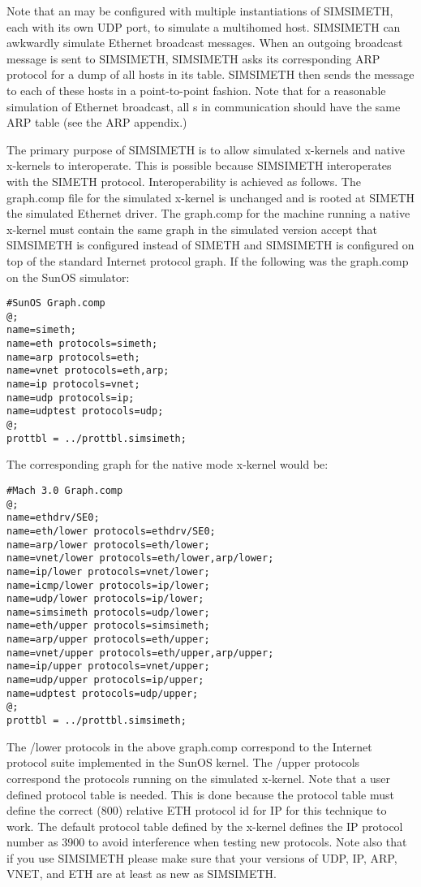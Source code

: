 Note that an \xk{} may be configured with multiple instantiations of
SIMSIMETH, each with its own UDP port, to simulate a multihomed host.
SIMSIMETH can awkwardly simulate Ethernet broadcast messages.  
When an
outgoing broadcast message is sent to SIMSIMETH, SIMSIMETH asks its
corresponding  ARP
protocol  for a dump of all hosts in its table.
SIMSIMETH then sends the message to each of these hosts in a
point-to-point fashion.  Note that for a reasonable simulation of
Ethernet broadcast, all
\xk{}s in communication should have the same ARP table (see the ARP
appendix.) 

The primary purpose of SIMSIMETH is to allow simulated x-kernels and 
native x-kernels to interoperate. This is possible because SIMSIMETH 
interoperates with the SIMETH protocol. Interoperability is achieved as 
follows. The graph.comp file for the simulated x-kernel is unchanged and 
is rooted at SIMETH the simulated Ethernet driver.  The graph.comp for the
machine running a native x-kernel must contain the same graph in the 
simulated version accept that SIMSIMETH is configured instead of SIMETH
and SIMSIMETH is configured on top of the standard Internet protocol 
graph.  If the following was the graph.comp on the SunOS simulator:

\begin{verbatim}
#SunOS Graph.comp
@;
name=simeth;
name=eth protocols=simeth;
name=arp protocols=eth; 
name=vnet protocols=eth,arp; 
name=ip protocols=vnet; 
name=udp protocols=ip;
name=udptest protocols=udp;
@;
prottbl = ../prottbl.simsimeth;
\end{verbatim}

The corresponding graph for the native mode x-kernel would be:

\begin{verbatim}
#Mach 3.0 Graph.comp
@;
name=ethdrv/SE0;
name=eth/lower protocols=ethdrv/SE0;
name=arp/lower protocols=eth/lower;
name=vnet/lower protocols=eth/lower,arp/lower;
name=ip/lower protocols=vnet/lower;
name=icmp/lower protocols=ip/lower;
name=udp/lower protocols=ip/lower;
name=simsimeth protocols=udp/lower;
name=eth/upper protocols=simsimeth;
name=arp/upper protocols=eth/upper;
name=vnet/upper protocols=eth/upper,arp/upper;
name=ip/upper protocols=vnet/upper;
name=udp/upper protocols=ip/upper;
name=udptest protocols=udp/upper;
@;
prottbl = ../prottbl.simsimeth;
\end{verbatim}

The /lower protocols in the above graph.comp correspond to the Internet 
protocol suite implemented in the SunOS kernel. The /upper protocols 
correspond the protocols running on the simulated x-kernel. Note that 
a user defined protocol table is needed. This is done because the 
protocol table must define the correct (800) relative ETH protocol id for 
IP for this  technique to work. The default protocol table defined by 
the x-kernel defines the IP protocol number as 3900 to avoid interference 
when testing new protocols. Note also that if you use SIMSIMETH 
please make sure that your versions of UDP, IP, ARP, VNET, and ETH
are at least as new as SIMSIMETH. 


